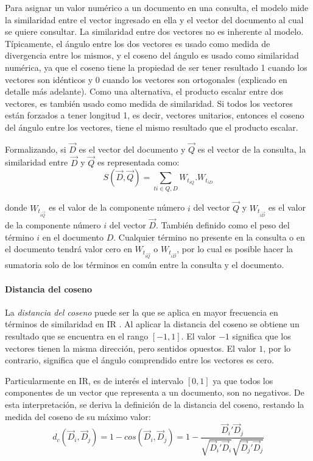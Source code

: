 \bigskip Para asignar un valor numérico a un documento en una consulta, el modelo mide la similaridad entre el vector ingresado en ella y el vector del documento al cual se quiere consultar. La similaridad entre dos vectores no es inherente al modelo. Típicamente, el ángulo entre los dos vectores es usado como medida de divergencia entre los mismos, y el coseno del ángulo es usado como similaridad numérica, ya que el coseno tiene la propiedad de ser tener resultado 1 cuando los vectores son idénticos y 0 cuando los vectores son ortogonales (explicado en detalle más adelante). Como una alternativa, el producto escalar entre dos vectores, es también usado como medida de similaridad. Si todos los vectores están forzados a tener longitud 1, es decir, vectores unitarios, entonces el coseno del ángulo entre los vectores, tiene el mismo resultado que el producto escalar.

\bigskip Formalizando, si \(\overrightarrow{D}\) es el vector del documento y \(\overrightarrow{Q}\) es el vector de la consulta, la similaridad entre \(\overrightarrow{D}\) y \(\overrightarrow{Q}\) es representada como:
\[S(\vec{D},\vec{Q})=\sum_{ti \in Q,D}^{ }{W_{t_{iQ}}.W_{t_{iD}}}\]

donde \(W_{t_{i \overrightarrow{Q}}}\) es el valor de la componente número \(i\) del vector \(\overrightarrow{Q}\) y \(W_{t_{i \overrightarrow{D}}}\) es el valor de la componente número \(i\) del vector \(\overrightarrow{D}\). También definido como el peso del término \(i\) en el documento \(D\). Cualquier término no presente en la consulta o en el documento tendrá valor cero en \(W_{t_{i \overrightarrow{Q}}}\) o \(W_{t_{i \overrightarrow{D}}}\), por lo cual es posible hacer la sumatoria solo de los términos en común entre la consulta y el documento.

\paragraph{Distancia del coseno}
La \textit{distancia del coseno} puede ser la que se aplica en mayor frecuencia en términos de similaridad en IR \citep{korenius2007principal}. Al aplicar la distancia del coseno se obtiene un resultado que se encuentra en el rango \([-1, 1]\). El valor \(-1\) significa que los vectores tienen la misma dirección, pero sentidos opuestos. El valor \(1\), por lo contrario, significa que el ángulo comprendido entre los vectores es cero.

\bigskip Particularmente en IR, es de interés el intervalo \([0, 1]\) ya que todos los componentes de un vector que representa a un documento, son no negativos. De esta interpretación, se deriva la definición de la distancia del coseno, restando la medida del coseno de su máximo valor:
\[d_c(\vec{D}_i, \vec{D}_j) = 1 - cos(\vec{D}_i, \vec{D}_j) = 1 - \frac{{\vec{D}_i}'\vec{D}_j}{\sqrt{{\vec{D}_i}'\vec{D}_i}\sqrt{{\vec{D}_j}'\vec{D}_j}}\]

